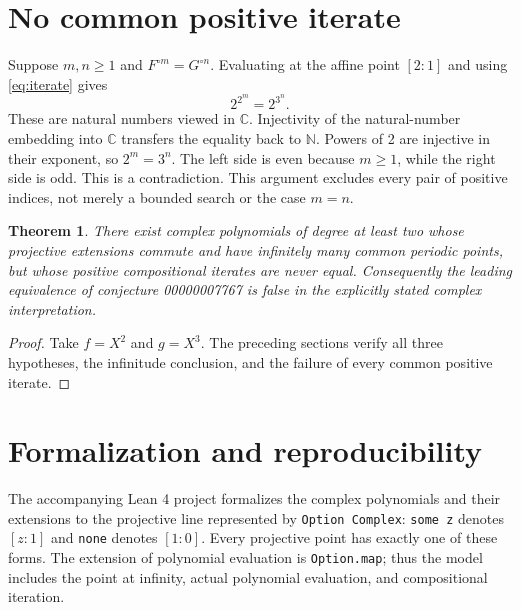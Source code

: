 \documentclass[11pt]{article}
\newtheorem{theorem}{Theorem}
\newcommand{\C}{\mathbb C}
\newcommand{\N}{\mathbb N}
\begin{document}
\section{No common positive iterate}
Suppose $m,n\geq1$ and $F^{\circ m}=G^{\circ n}$. Evaluating at the affine
point $[2:1]$ and using \eqref{eq:iterate} gives
\[
 2^{2^m}=2^{3^n}.
\]
These are natural numbers viewed in $\C$. Injectivity of the natural-number
embedding into $\C$ transfers the equality back to $\N$. Powers of 2
are injective in their exponent, so $2^m=3^n$. The left side is even because
$m\geq1$, while the right side is odd. This is a contradiction.
This argument excludes every pair of positive indices, not merely a bounded
search or the case $m=n$.

\begin{theorem}
There exist complex polynomials of degree at least two whose projective
extensions commute and have infinitely many common periodic points, but
whose positive compositional iterates are never equal. Consequently the
leading equivalence of conjecture 00000007767 is false in the explicitly
stated complex interpretation.
\end{theorem}
\begin{proof}
Take $f=X^2$ and $g=X^3$. The preceding sections verify all three hypotheses,
the infinitude conclusion, and the failure of every common positive iterate.
\end{proof}

\section{Formalization and reproducibility}
The accompanying Lean 4 project formalizes the complex polynomials and their
extensions to the projective line represented by \texttt{Option Complex}:
\texttt{some z} denotes $[z:1]$ and \texttt{none} denotes $[1:0]$.
Every projective point has exactly one of these forms. The extension of
polynomial evaluation is \texttt{Option.map}; thus the model includes the
point at infinity, actual polynomial evaluation, and compositional iteration.
\end{document}
